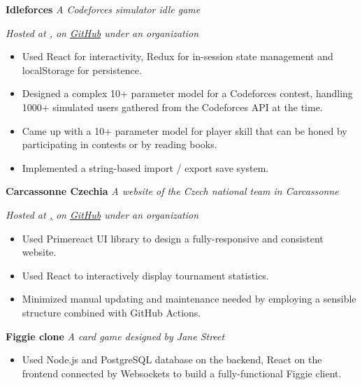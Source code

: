 \ifczech

\else

\textbf{Idleforces} \hfill \textit{A Codeforces simulator idle game} \par
\textit{Hosted at \href{https://idleforces.netlify.app/}, on \href{https://github.com/Idleforces/idleforces}{GitHub} under an organization}
\begin{itemize}
    \item Used React for interactivity, Redux for in-session state management and localStorage for persistence.
    \item Designed a complex 10+ parameter model for a Codeforces contest, handling 1000+ simulated users gathered from the Codeforces API at the time.
    \item Came up with a 10+ parameter model for player skill that can be honed by participating in contests or by reading books.
    \item Implemented a string-based import / export save system.
\end{itemize}

\textbf{Carcassonne Czechia} \hfill \textit{A website of the Czech national team in Carcassonne} \par
\textit{Hosted at \href{https://carcassonne-czechia.netlify.app/}, on \href{https://github.com/Carcassonne-Czechia/carcassonne-czechia}{GitHub} under an organization}
\begin{itemize}
    \item Used Primereact UI library to design a fully-responsive and consistent website.
    \item Used React to interactively display tournament statistics.
    \item Minimized manual updating and maintenance needed by employing a sensible structure combined with GitHub Actions.
\end{itemize}

\textbf{Figgie clone} \hfill \textit{A card game designed by Jane Street} \par
\begin{itemize}
    \item Used Node.js and PostgreSQL database on the backend, React on the frontend connected by Websockets to build a fully-functional Figgie client.
\end{itemize}
\fi